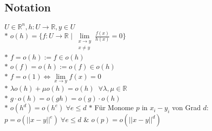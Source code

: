   \subsection{Notation}
    \(U\in\mathbb R^n, h:U\rightarrow\mathbb R, y\in U\)\\
    \(*\) \(o(h)=\{f:U\rightarrow\mathbb R\mid \lim\limits_{\substack{x\rightarrow y\\x\neq y}}\frac{f(x)}{h(x)}=0\}\)\\
    \(*\) \(f=o(h):=f\in o(h)\)\\
    \(*\) \(o(f)=o(h):=o(f)\in o(h)\)\\
    \(*\) \(f=o(1)\iff \lim\limits_{x\rightarrow y}f(x)=0\)\\
    \(*\) \(\lambda o(h) +\mu o(h) = o(h)\;\; \forall \lambda,\mu\in\mathbb R\)\\
    \(*\) \(g\cdot o(h)=o(gh) = o(g)\cdot o(h)\)\\
    \(*\) \(o(h^d)=o(h^e)\;\forall e\leq d\)
    \(*\) Für Monome \(p\) in \(x_i-y_i\) von Grad \(d\): \(p=o(||x-y||^e)\;\forall e\leq d\) \& \(o(p)=o(||x-y||^d)\)


